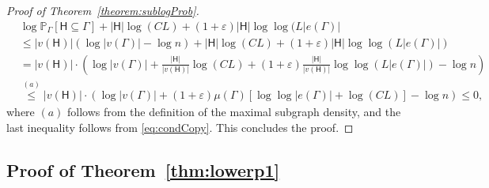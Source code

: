 \documentclass[12pt]{article}
\def\P{{\mathbb P}}
\newcommand{\p}[1]{\left(#1\right)}
\newcommand{\s}[1]{\mathsf{#1}}
\begin{document}
\begin{proof}[Proof of Theorem~\ref{theorem:sublogProb}]
    \begin{align}
        &\log \P_{\Gamma}[\s{H}\subseteq \Gamma]+|\s{H}|\log(CL)+(1+\varepsilon)|\s{H}|\log\log(L|e(\Gamma)|\\
        &\leq |v(\s{H})|\p{\log|v(\Gamma)|-\log n}+|\s{H}|\log(CL)+(1+\varepsilon)|\s{H}|\log\log(L|e(\Gamma)|)\\
        &=|v(\s{H})|\cdot \p{\log|v(\Gamma)|+\frac{|\s{H}|}{|v(\s{H})|}\log(CL) +(1+\varepsilon)\frac{|\s{H}|}{|v(\s{H})|} \log \log (L|e(\Gamma)|) -\log n}\\
        &\overset{(a)}{\leq}|v(\s{H})|\cdot \p{\log|v(\Gamma)|+(1+\varepsilon)\mu(\Gamma) [\log \log |e(\Gamma)|+\log(CL)] -\log n }\leq 0,
    \end{align}
    where $(a)$ follows from the definition of the maximal subgraph density, and the last inequality follows from \eqref{eq:condCopy}. This concludes the proof.
\end{proof}

\subsection{Proof of Theorem~\ref{thm:lowerp1}}\label{app:prrpf}
\end{document}
